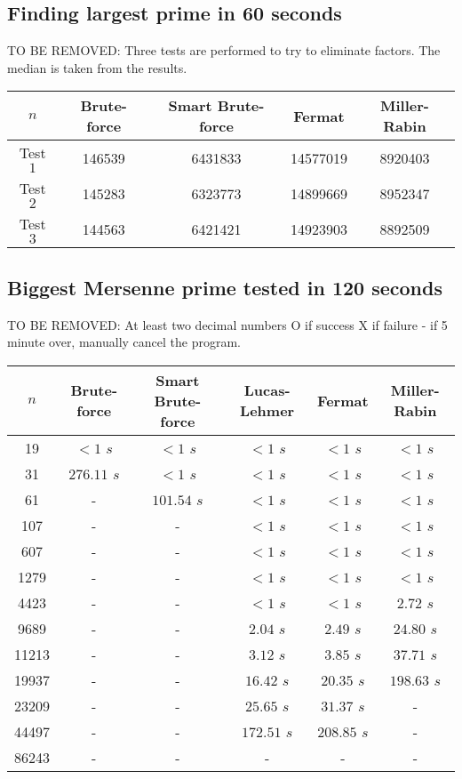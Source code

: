 \documentclass[main.tex]{subfiles}
\begin{document}
\subsection{Finding largest prime in 60 seconds}

TO BE REMOVED: Three tests are performed to try to eliminate factors. The median
is taken from the results.

\begin{table}[ht!]
  \centering
  \begin{tabular}{||c | c c c c||}
    \hline
    $n$ & Brute-force & Smart Brute-force & Fermat & Miller-Rabin \\ [0.5ex] 
    \hline\hline
    Test $1$ & 146539 & 6431833 & 14577019 & 8920403\\ 
    Test $2$ & 145283 & 6323773 & 14899669 & 8952347\\ 
    Test $3$ & 144563 & 6421421 & 14923903 & 8892509\\   [1ex] 
    \hline
  \end{tabular}
\end{table}

\subsection{Biggest Mersenne prime tested in 120 seconds}

TO BE REMOVED: At least two decimal numbers O if success X if failure - if 5
minute over, manually cancel the program.

\begin{table}[ht!]
  \centering
  \begin{tabular}{||c | c c c c c||}
    \hline
    $n$ & Brute-force & Smart Brute-force & Lucas-Lehmer & Fermat & Miller-Rabin  \\ [0.5ex] 
    \hline\hline
    19 & $<1$ $s$ & $<1$ $s$ & $<1$ $s$ & $<1$ $s$ & $<1$ $s$\\
    31 & $276.11$ $s$ & $<1$ $s$ & $<1$ $s$ & $<1$ $s$ & $<1$ $s$\\
    61 & - & $101.54$ $s$ & $<1$ $s$ & $<1$ $s$ & $<1$ $s$\\
    107 & - & - & $<1$ $s$ & $<1$ $s$ & $<1$ $s$\\
    607 & - & - & $<1$ $s$ & $<1$ $s$ & $<1$ $s$\\
    1279 & - & - & $<1$ $s$ & $<1$ $s$ & $<1$ $s$\\
    4423 & - & - & $<1$ $s$ & $<1$ $s$ & $2.72$ $s$\\
    9689 & - & - & $2.04$ $s$ & $2.49$ $s$ & $24.80$ $s$\\
    11213 & - & - & $3.12$ $s$ & $3.85$ $s$ & $37.71$ $s$\\
    19937 & - & - & $16.42$ $s$ & $20.35$ $s$ &  $198.63$ $s$\\
    23209 & - & - & $25.65$ $s$ & $31.37$ $s$ & -\\ 
    44497 & - & - &  $172.51$ $s$ &  $208.85$ $s$ & -\\ 
    86243 & - & - & - & - & -\\  [1ex] 
    \hline
  \end{tabular}
\end{table}
\end{document}
